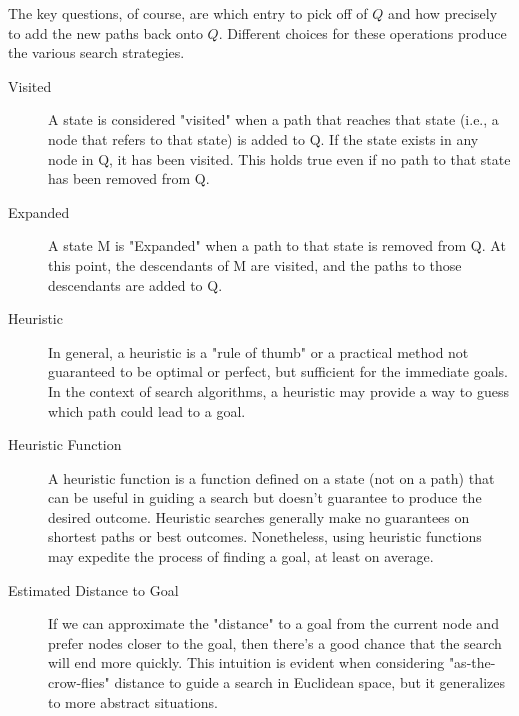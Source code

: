 \documentclass[a4paper,UKenglish,cleveref, autoref, thm-restate]{qlinhta}
\begin{document}
The key questions, of course, are which entry to pick off of $Q$ and how precisely to add the new paths back onto $Q$. Different choices for these operations produce the various search strategies.

\begin{description}
\item[Visited] A state is considered "visited" when a path that reaches that state (i.e., a node that refers to that state) is added to Q. If the state exists in any node in Q, it has been visited. This holds true even if no path to that state has been removed from Q.

\item[Expanded] A state M is "Expanded" when a path to that state is removed from Q. At this point, the descendants of M are visited, and the paths to those descendants are added to Q.

\item[Heuristic] In general, a heuristic is a "rule of thumb" or a practical method not guaranteed to be optimal or perfect, but sufficient for the immediate goals. In the context of search algorithms, a heuristic may provide a way to guess which path could lead to a goal.

\item[Heuristic Function] A heuristic function is a function defined on a state (not on a path) that can be useful in guiding a search but doesn't guarantee to produce the desired outcome. Heuristic searches generally make no guarantees on shortest paths or best outcomes. Nonetheless, using heuristic functions may expedite the process of finding a goal, at least on average.

\item[Estimated Distance to Goal] If we can approximate the "distance" to a goal from the current node and prefer nodes closer to the goal, then there's a good chance that the search will end more quickly. This intuition is evident when considering "as-the-crow-flies" distance to guide a search in Euclidean space, but it generalizes to more abstract situations.
\end{description}
\end{document}
